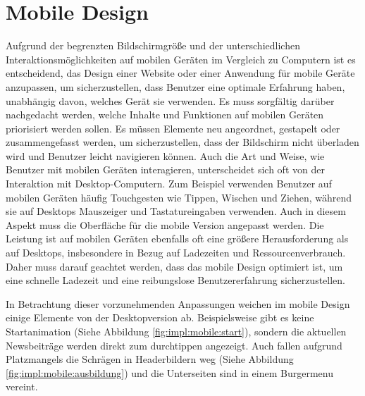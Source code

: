 \section{Mobile Design}

Aufgrund der begrenzten Bildschirmgröße und der unterschiedlichen Interaktionsmöglichkeiten auf mobilen Geräten im Vergleich zu 
Computern ist es entscheidend, das Design einer Website oder einer Anwendung für mobile Geräte anzupassen, um sicherzustellen, 
dass Benutzer eine optimale Erfahrung haben, unabhängig davon, welches Gerät sie verwenden.
Es muss sorgfältig darüber nachgedacht werden, welche Inhalte und Funktionen auf mobilen Geräten priorisiert werden sollen. Es müssen Elemente neu angeordnet,
 gestapelt oder zusammengefasst werden, um sicherzustellen, dass der Bildschirm nicht überladen wird und Benutzer leicht navigieren können.
Auch die Art und Weise, wie Benutzer mit mobilen Geräten interagieren, unterscheidet sich oft von der Interaktion mit Desktop-Computern. 
 Zum Beispiel verwenden Benutzer auf mobilen Geräten häufig Touchgesten wie Tippen, Wischen und Ziehen, während sie auf Desktops Mauszeiger 
 und Tastatureingaben verwenden. Auch in diesem Aspekt muss die Oberfläche für die mobile Version angepasst werden.
Die Leistung ist auf mobilen Geräten ebenfalls oft eine größere Herausforderung als auf Desktops, insbesondere in Bezug auf Ladezeiten 
und Ressourcenverbrauch. Daher muss darauf geachtet werden, dass das mobile Design optimiert ist, um eine schnelle 
Ladezeit und eine reibungslose Benutzererfahrung sicherzustellen. 

In Betrachtung dieser vorzunehmenden Anpassungen weichen im mobile Design einige Elemente von der Desktopversion ab.
Beispielsweise gibt es keine Startanimation (Siehe Abbildung \ref{fig:impl:mobile:start}), sondern die aktuellen Newsbeiträge werden direkt zum durchtippen angezeigt.
Auch fallen aufgrund Platzmangels die Schrägen in Headerbildern weg (Siehe Abbildung \ref{fig:impl:mobile:ausbildung}) und die Unterseiten sind in einem Burgermenu vereint. 


